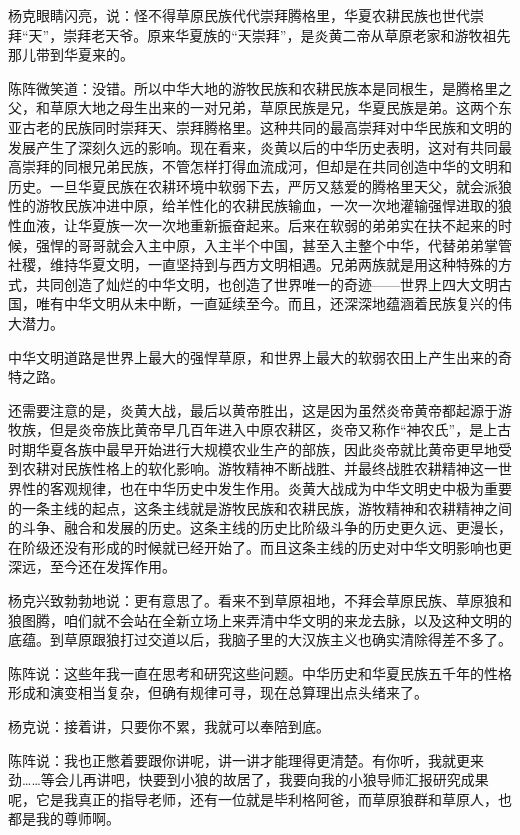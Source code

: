 \par 杨克眼睛闪亮，说：怪不得草原民族代代崇拜腾格里，华夏农耕民族也世代崇拜“天”，崇拜老天爷。原来华夏族的“天崇拜”，是炎黄二帝从草原老家和游牧祖先那儿带到华夏来的。
\par 陈阵微笑道：没错。所以中华大地的游牧民族和农耕民族本是同根生，是腾格里之父，和草原大地之母生出来的一对兄弟，草原民族是兄，华夏民族是弟。这两个东亚古老的民族同时崇拜天、崇拜腾格里。这种共同的最高崇拜对中华民族和文明的发展产生了深刻久远的影响。现在看来，炎黄以后的中华历史表明，这对有共同最高崇拜的同根兄弟民族，不管怎样打得血流成河，但却是在共同创造中华的文明和历史。一旦华夏民族在农耕环境中软弱下去，严厉又慈爱的腾格里天父，就会派狼性的游牧民族冲进中原，给羊性化的农耕民族输血，一次一次地灌输强悍进取的狼性血液，让华夏族一次一次地重新振奋起来。后来在软弱的弟弟实在扶不起来的时候，强悍的哥哥就会入主中原，入主半个中国，甚至入主整个中华，代替弟弟掌管社稷，维持华夏文明，一直坚持到与西方文明相遇。兄弟两族就是用这种特殊的方式，共同创造了灿烂的中华文明，也创造了世界唯一的奇迹——世界上四大文明古国，唯有中华文明从未中断，一直延续至今。而且，还深深地蕴涵着民族复兴的伟大潜力。
\par 中华文明道路是世界上最大的强悍草原，和世界上最大的软弱农田上产生出来的奇特之路。
\par 还需要注意的是，炎黄大战，最后以黄帝胜出，这是因为虽然炎帝黄帝都起源于游牧族，但是炎帝族比黄帝早几百年进入中原农耕区，炎帝又称作“神农氏”，是上古时期华夏各族中最早开始进行大规模农业生产的部族，因此炎帝就比黄帝更早地受到农耕对民族性格上的软化影响。游牧精神不断战胜、并最终战胜农耕精神这一世界性的客观规律，也在中华历史中发生作用。炎黄大战成为中华文明史中极为重要的一条主线的起点，这条主线就是游牧民族和农耕民族，游牧精神和农耕精神之间的斗争、融合和发展的历史。这条主线的历史比阶级斗争的历史更久远、更漫长，在阶级还没有形成的时候就已经开始了。而且这条主线的历史对中华文明影响也更深远，至今还在发挥作用。
\par 杨克兴致勃勃地说：更有意思了。看来不到草原祖地，不拜会草原民族、草原狼和狼图腾，咱们就不会站在全新立场上来弄清中华文明的来龙去脉，以及这种文明的底蕴。到草原跟狼打过交道以后，我脑子里的大汉族主义也确实清除得差不多了。
\par 陈阵说：这些年我一直在思考和研究这些问题。中华历史和华夏民族五千年的性格形成和演变相当复杂，但确有规律可寻，现在总算理出点头绪来了。
\par 杨克说：接着讲，只要你不累，我就可以奉陪到底。
\par 陈阵说：我也正憋着要跟你讲呢，讲一讲才能理得更清楚。有你听，我就更来劲……等会儿再讲吧，快要到小狼的故居了，我要向我的小狼导师汇报研究成果呢，它是我真正的指导老师，还有一位就是毕利格阿爸，而草原狼群和草原人，也都是我的尊师啊。
